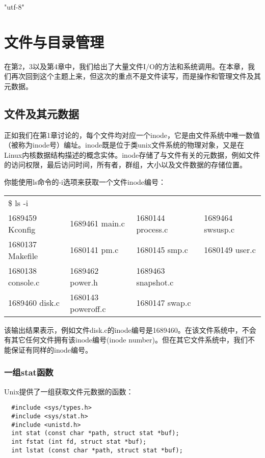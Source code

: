 \ifx\atempxetex\usewhat
\XeTeXinputencoding "utf-8"
\fi
{}

\chapter{文件与目录管理}

在第2，3以及第4章中，我们给出了大量文件I/O的方法和系统调用。在本章，我们再次回到这个主题上来，但这次的重点不是文件读写，而是操作和管理文件及其元数据。

\section{文件及其元数据}

正如我们在第1章讨论的，每个文件均对应一个inode，它是由文件系统中唯一数值（被称为inode号）编址。inode既是位于类unix文件系统的物理对象，又是在Linux内核数据结构描述的概念实体。inode存储了与文件有关的元数据，例如文件的访问权限，最后访问时间，所有者，群组，大小以及文件数据的存储位置。 

你能使用ls命令的-i选项来获取一个文件inode编号：

\begin{tabular}{llll}
\$ ls -i & & &\\
1689459 Kconfig & 1689461 main.c & 1680144 process.c & 1689464 swsusp.c\\
1680137 Makefile & 1680141 pm.c & 1680145 smp.c & 1680149 user.c\\
1680138 console.c & 1689462 power.h & 1689463 snapshot.c & \\
1689460 disk.c & 1680143 poweroff.c & 1680147 swap.c & \\
\end{tabular}

该输出结果表示，例如文件disk.c的inode编号是1689460。在该文件系统中，不会有其它任何文件拥有该inode编号(inode number)。但在其它文件系统中，我们不能保证有同样的inode编号。 

\subsection{一组stat函数}

Unix提供了一组获取文件元数据的函数：

\begin{lstlisting}
  #include <sys/types.h>
  #include <sys/stat.h>
  #include <unistd.h>
  int stat (const char *path, struct stat *buf);
  int fstat (int fd, struct stat *buf);
  int lstat (const char *path, struct stat *buf);
\end{lstlisting}

